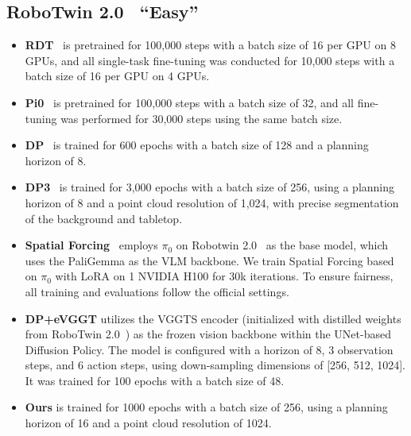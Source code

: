 \documentclass[runningheads]{llncs}
\begin{document}
\subsection{RoboTwin 2.0~\cite{chen2025robotwin} ``Easy''}
\begin{itemize}
    \item \textbf{RDT}~\cite{liu2025rdt1bdiffusionfoundationmodel} is pretrained for 100,000 steps with a batch size of 16 per GPU on 8 GPUs, and all single-task fine-tuning was conducted for 10,000 steps with a batch size of 16 per GPU on 4 GPUs.
    
    \item \textbf{Pi0}~\cite{black2024pi_0} is pretrained for 100,000 steps with a batch size of 32, and all fine-tuning was performed for 30,000 steps using the same batch size.

    
    \item \textbf{DP}~\cite{chi2024diffusionpolicyvisuomotorpolicy} is trained for 600 epochs with a batch size of 128 and a planning horizon of 8.
    
    \item \textbf{DP3}~\cite{ze20243d} is trained for 3,000 epochs with a batch size of 256, using a planning horizon of 8 and a point cloud resolution of 1,024, with precise segmentation of the background and tabletop.
    \item \textbf{Spatial Forcing}~\cite{li2025spatialforcingimplicitspatial} employs $\pi_0$ on Robotwin 2.0~\cite{chen2025robotwin} as the base model, which uses the PaliGemma as the VLM backbone. We train Spatial Forcing based on $\pi_0$ with LoRA on 1 NVIDIA H100 for 30k iterations. To ensure fairness, all training and evaluations follow the official settings.
    \item \textbf{DP+eVGGT} utilizes the VGGTS encoder (initialized with distilled weights from RoboTwin 2.0~\cite{chen2025robotwin}) as the frozen vision backbone within the UNet-based Diffusion Policy. The model is configured with a horizon of 8, 3 observation steps, and 6 action steps, using down-sampling dimensions of [256, 512, 1024]. It was trained for 100 epochs with a batch size of 48.
    \item \textbf{Ours} is trained for 1000 epochs with a batch size of 256, using a planning horizon of 16 and a point cloud resolution of 1024.
\end{itemize}
\end{document}
